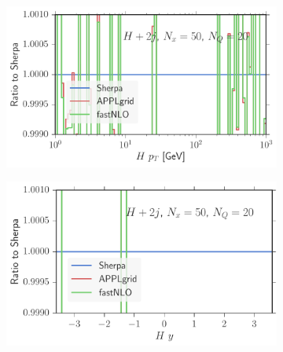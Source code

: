 \begin{figure}
\centering
\begin{subfigure}[]{0.49\textwidth}
	\includegraphics[width=\textwidth]{images/hjjrs_hpt.pdf}
\end{subfigure}
\begin{subfigure}[]{0.49\textwidth}
	\includegraphics[width=\textwidth]{images/hjjrs_hy.pdf}
\end{subfigure}


\end{figure}

